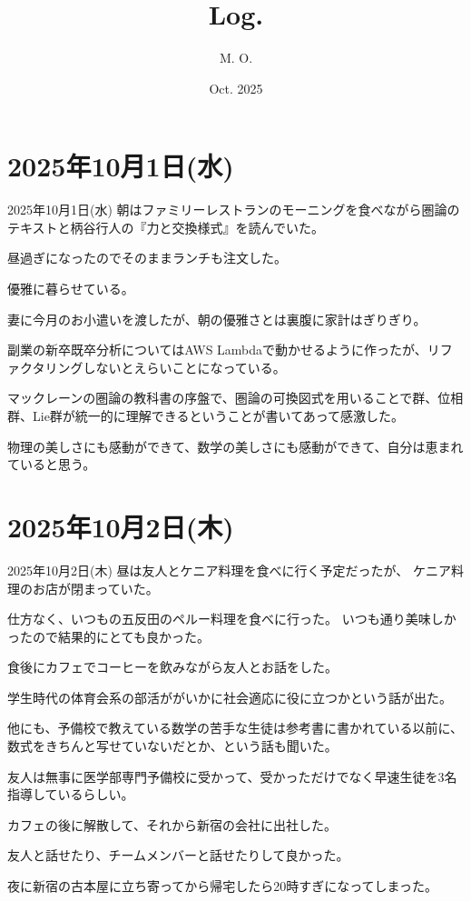 \documentclass[dvipdfmx, autodetect-engine, aspectratio=169, 10.5pt]{beamer}
\title{
Log.
}
\author{
M. O.
}
\date{Oct. 2025}
\begin{document}
\maketitle

\section{2025年10月1日(水)}

\begin{frame}{2025年10月1日(水)}
朝はファミリーレストランのモーニングを食べながら圏論のテキストと柄谷行人の『力と交換様式』を読んでいた。

昼過ぎになったのでそのままランチも注文した。

優雅に暮らせている。

妻に今月のお小遣いを渡したが、朝の優雅さとは裏腹に家計はぎりぎり。

副業の新卒既卒分析についてはAWS Lambdaで動かせるように作ったが、リファクタリングしないとえらいことになっている。

マックレーンの圏論の教科書の序盤で、圏論の可換図式を用いることで群、位相群、Lie群が統一的に理解できるということが書いてあって感激した。

物理の美しさにも感動ができて、数学の美しさにも感動ができて、自分は恵まれていると思う。
\end{frame}

\section{2025年10月2日(木)}

\begin{frame}{2025年10月2日(木)}
昼は友人とケニア料理を食べに行く予定だったが、
ケニア料理のお店が閉まっていた。

仕方なく、いつもの五反田のペルー料理を食べに行った。
いつも通り美味しかったので結果的にとても良かった。

食後にカフェでコーヒーを飲みながら友人とお話をした。

学生時代の体育会系の部活ががいかに社会適応に役に立つかという話が出た。

他にも、予備校で教えている数学の苦手な生徒は参考書に書かれている以前に、数式をきちんと写せていないだとか、という話も聞いた。

友人は無事に医学部専門予備校に受かって、受かっただけでなく早速生徒を3名指導しているらしい。

カフェの後に解散して、それから新宿の会社に出社した。

友人と話せたり、チームメンバーと話せたりして良かった。

夜に新宿の古本屋に立ち寄ってから帰宅したら20時すぎになってしまった。
\end{frame}
\end{document}
